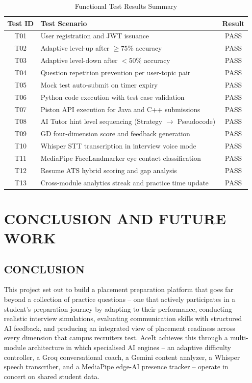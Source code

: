 \documentclass[12pt,a4paper]{report}
\begin{document}
\begin{table}[H]
    \centering
    \caption{Functional Test Results Summary}
    \label{tab:testresults}
    \begin{tabular}{|c|l|c|}
        \hline
        \textbf{Test ID} & \textbf{Test Scenario} & \textbf{Result} \\
        \hline
        T01 & User registration and JWT issuance & PASS \\
        T02 & Adaptive level-up after $\geq$75\% accuracy & PASS \\
        T03 & Adaptive level-down after $<$50\% accuracy & PASS \\
        T04 & Question repetition prevention per user-topic pair & PASS \\
        T05 & Mock test auto-submit on timer expiry & PASS \\
        T06 & Python code execution with test case validation & PASS \\
        T07 & Piston API execution for Java and C++ submissions & PASS \\
        T08 & AI Tutor hint level sequencing (Strategy $\to$ Pseudocode) & PASS \\
        T09 & GD four-dimension score and feedback generation & PASS \\
        T10 & Whisper STT transcription in interview voice mode & PASS \\
        T11 & MediaPipe FaceLandmarker eye contact classification & PASS \\
        T12 & Resume ATS hybrid scoring and gap analysis & PASS \\
        T13 & Cross-module analytics streak and practice time update & PASS \\
        \hline
    \end{tabular}
\end{table}

\chapter{CONCLUSION AND FUTURE WORK}

\section{CONCLUSION}

This project set out to build a placement preparation platform that goes far beyond a collection of practice questions -- one that actively participates in a student's preparation journey by adapting to their performance, conducting realistic interview simulations, evaluating communication skills with structured AI feedback, and producing an integrated view of placement readiness across every dimension that campus recruiters test. AceIt achieves this through a multi-module architecture in which specialised AI engines -- an adaptive difficulty controller, a Groq conversational coach, a Gemini content analyzer, a Whisper speech transcriber, and a MediaPipe edge-AI presence tracker -- operate in concert on shared student data.
\end{document}

